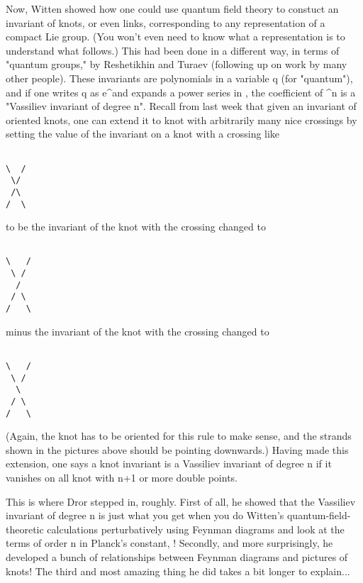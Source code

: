 Now, Witten showed how one could use quantum field theory to constuct an
invariant of knots, or even links, corresponding to any representation
of a compact Lie group.  (You won't even need to know what a
representation is to understand what follows.)  This had been done in a
different way, in terms of "quantum groups," by Reshetikhin and Turaev
(following up on work by many other people).  These invariants are
polynomials in a variable q (for "quantum"), and if one writes q as
e^\hbar  and expands a power series in \hbar , the coefficient of \hbar ^n is
a "Vassiliev invariant of degree n".  Recall from last week that
given an invariant of oriented knots, one can extend
it to knot with arbitrarily many nice crossings by setting
the value of the invariant on a knot with a crossing like


\begin{verbatim}

\  /
 \/
 /\
/  \
\end{verbatim}
    

to be the invariant of the knot with the crossing changed to


\begin{verbatim}

\   /
 \ /
  /
 / \
/   \
\end{verbatim}
    
minus the invariant of the knot with the crossing changed to


\begin{verbatim}

\   /
 \ /
  \
 / \
/   \
\end{verbatim}
    

(Again, the knot has to be oriented for this rule to make sense,
and the strands shown in the pictures above should be pointing
downwards.)   Having made this extension, one says a knot
invariant is a Vassiliev invariant of degree n if it vanishes
on all knot with n+1 or more double points.

This is where Dror stepped in, roughly.  First of all, he showed that
the Vassiliev invariant of degree n is just what you get when you do
Witten's quantum-field-theoretic calculations perturbatively using
Feynman diagrams and look at the terms of order n in Planck's constant,
\hbar !  Secondly, and more surprisingly, he developed a bunch of
relationships between Feynman diagrams and pictures of knots!  The third
and most amazing thing he did takes a bit longer to explain...

